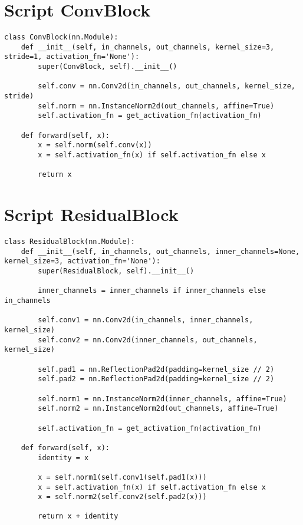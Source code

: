 \section{Script ConvBlock}
\label{sec:script_conv_block}
\begin{listing}[H]
\begin{verbatim}
class ConvBlock(nn.Module):
    def __init__(self, in_channels, out_channels, kernel_size=3, stride=1, activation_fn='None'):
        super(ConvBlock, self).__init__()

        self.conv = nn.Conv2d(in_channels, out_channels, kernel_size, stride)
        self.norm = nn.InstanceNorm2d(out_channels, affine=True)
        self.activation_fn = get_activation_fn(activation_fn)

    def forward(self, x):
        x = self.norm(self.conv(x))
        x = self.activation_fn(x) if self.activation_fn else x

        return x
\end{verbatim}
\label{lst:script_conv_block}
\end{listing}

\section{Script ResidualBlock}
\label{sec:script_residual_block}
\begin{listing}[H]
\begin{verbatim}
class ResidualBlock(nn.Module):
    def __init__(self, in_channels, out_channels, inner_channels=None, kernel_size=3, activation_fn='None'):
        super(ResidualBlock, self).__init__()

        inner_channels = inner_channels if inner_channels else in_channels

        self.conv1 = nn.Conv2d(in_channels, inner_channels, kernel_size)
        self.conv2 = nn.Conv2d(inner_channels, out_channels, kernel_size)

        self.pad1 = nn.ReflectionPad2d(padding=kernel_size // 2)
        self.pad2 = nn.ReflectionPad2d(padding=kernel_size // 2)

        self.norm1 = nn.InstanceNorm2d(inner_channels, affine=True)
        self.norm2 = nn.InstanceNorm2d(out_channels, affine=True)

        self.activation_fn = get_activation_fn(activation_fn)

    def forward(self, x):
        identity = x

        x = self.norm1(self.conv1(self.pad1(x)))
        x = self.activation_fn(x) if self.activation_fn else x
        x = self.norm2(self.conv2(self.pad2(x)))

        return x + identity
\end{verbatim}
\label{lst:script_residual_block}
\end{listing}

